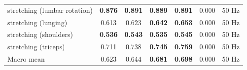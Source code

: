 \begin{table}[H]
\begin{tabular}{lcccccc}
    stretching (lumbar rotation)   & \textbf{0.876} & \textbf{0.891} & \textbf{0.889} & \textbf{0.891} & 0.000 & 50 Hz \\
    stretching (lunging)           & 0.613 & 0.623 & \textbf{0.642} & \textbf{0.653} & 0.000 & 50 Hz \\
    stretching (shoulders)         & \textbf{0.536} & \textbf{0.543} & \textbf{0.535} & \textbf{0.545} & 0.000 & 50 Hz \\
    stretching (triceps)           & 0.711 & 0.738 & \textbf{0.745} & \textbf{0.759} & 0.000 & 50 Hz \\
    \midrule
    Macro mean                     & 0.623 & 0.644 & \textbf{0.681} & \textbf{0.698} & 0.000 & 50 Hz \\
    \bottomrule
  \end{tabular}
\end{table}

